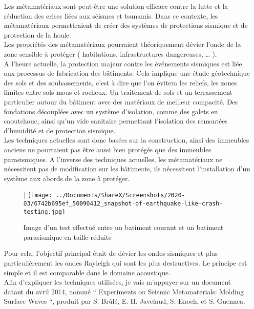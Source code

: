 \documentclass[12pt,a4paper]{article}
\begin{document}
Les métamatériaux sont peut-être une solution efficace contre la lutte et la réduction des crises liées aux séismes et tsunamis. Dans ce contexte, les métamatériaux permettraient de créer des systèmes de protections sismique et de protection de la houle. \\
 Les propriétés des métamatériaux pourraient théoriquement dévier l’onde de la zone sensible à protéger ( habitations, infrastructures dangereuses, … ). \\

A l’heure actuelle, la protection majeur contre les événements sismiques est liée aux processus de fabrication des bâtiments. Cela implique une étude géotechnique des sols et des soubassements, c’est à dire que l’on évitera les reliefs, les zones limites entre sols mous et rocheux. Un traitement de sols et un terrassement particulier autour du bâtiment avec des matériaux de meilleur compacité. Des fondations découplées avec un système d’isolation, comme des galets en caoutchouc, ainsi qu’un vide sanitaire permettant l’isolation des remontées d’humidité et de protection sismique. \\



	Les techniques actuelles sont donc basées sur la construction, ainsi des immeubles anciens ne pourraient pas être aussi bien protégés que des immeubles parasismiques. A l’inverse des techniques actuelles, les métamatériaux ne nécessitent pas de modification sur les bâtiments, ils nécessitent l’installation d’un système aux abords de la zone à protéger.\newpage
\begin{wrapfigure}{l}{7.0cm}]
\centering
\texttt{[image: ../Documents/ShareX/Screenshots/2020-03/6742b695ef\_50090412\_snapshot-of-earthquake-like-crash-testing.jpg]}
\caption{Image d'un test effectué entre un batiment courant et un batiment parasismique en taille réduite}
\end{wrapfigure}

	Pour cela, l’objectif principal était de dévier les ondes sismiques et plus particulièrement les ondes Rayleigh qui sont les plus destructives. Le principe est simple et il est comparable dans le domaine acoustique.\\

	Afin d’expliquer les techniques utilisées, je vais m’appuyer sur un document datant du avril 2014, nommé “ Experiments on Seismic Metamaterials: Molding Surface Waves “, produit par S. Brûlé, E. H. Javelaud, S. Enoch, et S. Guennea.\cite{1} \\
\end{document}
